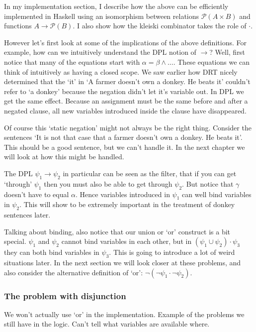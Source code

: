\documentclass[12pt]{article}
\begin{document}
In my implementation section, I describe how the above can be efficiently implemented in Haskell using an isomorphism between relations $\mathcal{P}(A\times B)$ and functions $A\to\mathcal{P}(B)$. I also show how the kleiski combinator takes the role of $\cdot$.

However let's first look at some of the implications of the above definitions. For example, how can we intuitively understand the DPL notion of $\rightarrow$? Well, first notice that many of the equations start with $\alpha=\beta\wedge\dots$. These equations we can think of intuitively as having a closed scope. We saw earlier how DRT nicely determined that the `it' in `A farmer doesn't own a donkey. He beats it' couldn't refer to `a donkey' because the negation didn't let it's variable out. In DPL we get the same effect. Because an assignment must be the same before and after a negated clause, all new variables introduced inside the clause have disappeared.

Of course this `static negation' might not always be the right thing. Consider the sentences `It is not that case that a farmer doesn't own a donkey. He beats it'. This should be a good sentence, but we can't handle it. In the next chapter we will look at how this might be handled.

The DPL $\psi_1\rightarrow\psi_2$ in particular can be seen as the filter, that if you can get `through' $\psi_1$ then you must also be able to get through $\psi_2$. But notice that $\gamma$ doesn't have to equal $\alpha$. Hence variables introduced in $\psi_1$ can well bind variables in $\psi_2$. This will show to be extremely important in the treatment of donkey sentences later.

Talking about binding, also notice that our union or `or' construct is a bit special. $\psi_1$ and $\psi_2$ cannot bind variables in each other, but in $(\psi_1\cup\psi_2)\cdot\psi_3$ they can both bind variables in $\psi_3$. This is going to introduce a lot of weird situations later. In the next section we will look closer at these problems, and also consider the alternative definition of `or': $\neg(\neg\psi_1\cdot\neg\psi_2)$.

\subsubsection{The problem with disjunction}

We won't actually use `or' in the implementation.
Example of the problems we still have in the logic.
Can't tell what variables are available where.
\end{document}
